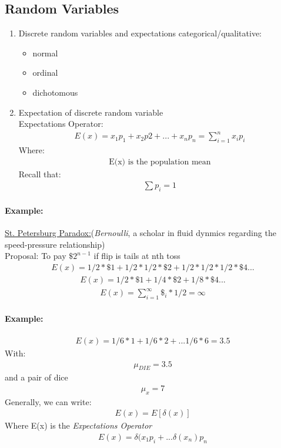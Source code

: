 \subsection{Random Variables}
\begin{enumerate}[1)]
\item Discrete random variables and expectations
categorical/qualitative:
\begin{itemize}
\item normal
\item ordinal
\item dichotomous
\end{itemize}
\item Expectation of discrete random variable\\
Expectations Operator:
\begin{eqnarray}
E(x)= x_{1}p_{1} + x_{2}p{2}+...+x_{n}p_{n}=\sum_{i=1}^{n} x_{i} p_{i}
\end{eqnarray}
Where:
\begin{eqnarray*}
\text{E(x) is the population mean}
\end{eqnarray*}
Recall that:
\begin{eqnarray*}
\sum p_{i} =1
\end{eqnarray*}
\end {enumerate}
\paragraph{Example:}
\underline{St. Petersburg Paradox:}(\textit{Bernoulli}, a scholar in fluid dynmics regarding the speed-pressure relationship)\\
Proposal: To pay $\$2^{n-1}$ if flip is tails at nth toss\\
\begin{eqnarray*}
E(x)= 1/2*\$1+1/2*1/2*\$2+1/2*1/2*1/2*\$4...
\end{eqnarray*}
\begin{eqnarray*}
E(x)= 1/2*\$1+1/4*\$2+1/8*\$4...
\end{eqnarray*}
\begin{eqnarray*}
E(x)=\sum_{i=1}^{ \infty} \$_{i}*1/2=\infty
\end{eqnarray*}
\paragraph{Example:}
\begin{eqnarray*}
E(x)= 1/6*1+1/6*2+...1/6*6=3.5
\end{eqnarray*}
With:
\begin{eqnarray*}
\mu_{DIE}=3.5 
\end{eqnarray*}
and a pair of dice 
\begin{eqnarray*}
\mu_{x}=7
\end{eqnarray*}
Generally, we can write:
\begin{eqnarray*}
E(x)=E[\delta(x)]
\end{eqnarray*}
Where E(x) is the \textit{Expectations Operator}
\begin{eqnarray*}
E(x)=\delta(x_{1}p_{i}+...\delta(x_{n})p_{n}
\end{eqnarray*}


